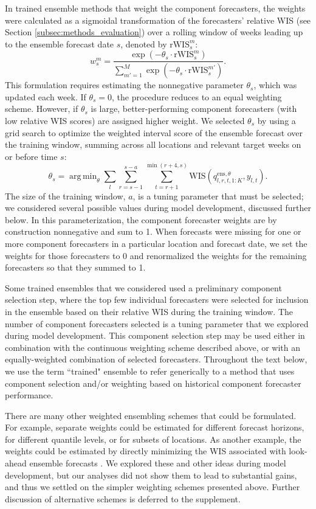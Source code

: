 \documentclass[11pt,3p,review,authoryear]{elsarticle}
\DeclareMathOperator*{\argmin}{arg\,min}
\def\ens{\mathrm{ens}}
\def\WIS{\mathrm{WIS}}
\def\rWIS{\mathrm{rWIS}}
\begin{document}
In trained ensemble methods that weight the component forecasters, the weights were calculated as a sigmoidal transformation of the forecasters' relative WIS (see Section \ref{subsec:methods_evaluation}) over a rolling window of weeks leading up to the ensemble forecast date $s$, denoted by $\rWIS^{m}_{s}$:
$$
w^m_{s} = \frac{\exp(-\theta_s \cdot \rWIS^{m}_{s} )}{\sum_{m' = 1}^M \exp(-\theta_s \cdot \rWIS^{m'}_{s} )}.
$$
This formulation requires estimating the nonnegative parameter $\theta_s$, which was updated each week.
If $\theta_s = 0$, the procedure reduces to an equal weighting scheme.
However, if $\theta_s$ is large, better-performing component forecasters (with low relative WIS scores) are assigned higher weight.
We selected $\theta_s$ by using a grid search to optimize the weighted interval score of the ensemble forecast over the training window, summing across all locations and relevant target weeks on or before time $s$:
$$
\theta_s = \argmin_\theta \sum_{l} \sum_{r = s - 1}^{s-a} \sum_{t = r + 1}^{\min(r + 4, s)} \WIS(q^{\ens, \theta}_{l,r,t,1:K}, y_{l,t}).
$$
The size of the training window, $a$, is a tuning parameter that must be selected; we considered several possible values during model development, discussed further below.
In this parameterization, the component forecaster weights are by construction nonnegative and sum to 1. When forecasts were missing for one or more component forecasters in a particular location and forecast date, we set the weights for those forecasters to 0 and renormalized the weights for the remaining forecasters so that they summed to 1.

Some trained ensembles that we considered used a preliminary component selection step, where the top few individual forecasters were selected for inclusion in the ensemble based on their relative WIS during the training window.
The number of component forecasters selected is a tuning parameter that we explored during model development.
This component selection step may be used either in combination with the continuous weighting scheme described above, or with an equally-weighted combination of selected forecasters.
Throughout the text below, we use the term ``trained" ensemble to refer generically to a method that uses component selection and/or weighting based on historical component forecaster performance.

There are many other weighted ensembling schemes that could be formulated. For example, separate weights could be estimated for different forecast horizons, for different quantile levels, or for subsets of locations. 
As another example, the weights could be estimated by directly minimizing the WIS associated with look-ahead ensemble forecasts \citep{taylor2021combiningForecastsCOVID}.
We explored these and other ideas during model development, but our analyses did not show them to lead to substantial gains, and thus we settled on the simpler weighting schemes presented above. Further discussion of alternative schemes is deferred to the supplement.
\end{document}

